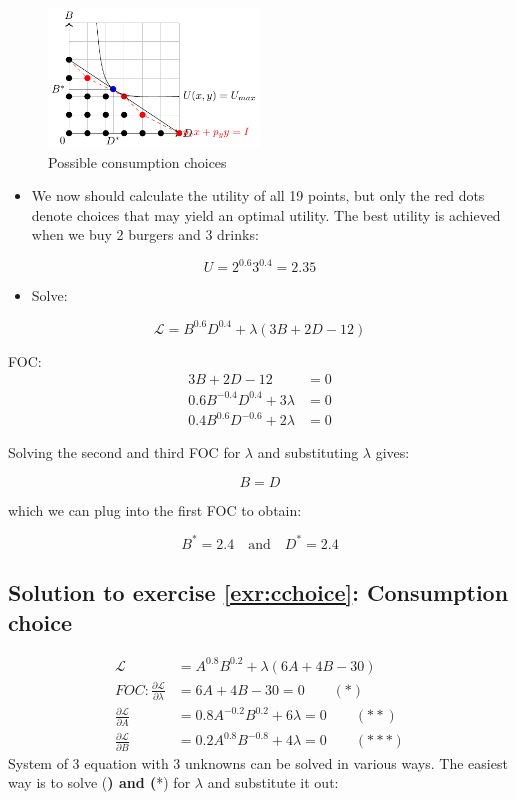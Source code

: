 \documentclass[
  12pt,
  oneside]{book}
\providecommand{\tightlist}{%
  \setlength{\itemsep}{0pt}\setlength{\parskip}{0pt}}
\theoremstyle{definition}
\theoremstyle{definition}
\theoremstyle{definition}
\theoremstyle{definition}
\theoremstyle{remark}
\begin{document}
\begin{figure}
\centering
\includegraphics[width=0.5\textwidth,height=\textheight]{fig/burgerutility.png}
\caption{\label{fig:burgerutility2} Possible consumption choices}
\end{figure}

\begin{itemize}
\tightlist
\item
  We now should calculate the utility of all 19 points, but only the red dots denote choices that may yield an optimal utility. The best utility is achieved when we buy 2 burgers and 3 drinks:
\end{itemize}

\[U=2^{0.6}3^{0.4}=2.35\]

\begin{itemize}
\tightlist
\item
  Solve:
\end{itemize}

\[
\mathcal{L}=B^{0.6}D^{0.4}+\lambda(3B+2D-12)
\]

FOC:
\begin{align*}
3B+2D-12&=0\\
0.6B^{-0.4}D^{0.4}+3\lambda&=0\\
0.4B^{0.6}D^{-0.6}+2\lambda&=0
\end{align*}

Solving the second and third FOC for \(\lambda\) and substituting \(\lambda\) gives:

\[B=D\]

which we can plug into the first FOC to obtain:

\[B^*=2.4 \quad \text{and} \quad D^*=2.4\]

\hypertarget{sol:cchoice}{%
\subsection*{Solution to exercise \ref{exr:cchoice}: Consumption choice}\label{sol:cchoice}}

\begin{align*}
\mathcal{L}&=A^{0.8}B^{0.2}+\lambda(6A+4B-30)\\
FOC: \frac{\partial \mathcal{L}}{\partial \lambda}&=6A+4B-30=0 \qquad (*)\\
\frac{\partial \mathcal{L}}{\partial A}&=0.8A^{-0.2}B^{0.2}+6\lambda=0 \qquad (**)\\
\frac{\partial \mathcal{L}}{\partial B}&=0.2A^{0.8}B^{-0.8}+4\lambda=0 \qquad (***)
\end{align*}
System of 3 equation with 3 unknowns can be solved in various ways.
The easiest way is to solve (\textbf{) and (}*) for \(\lambda\) and substitute it out:
\end{document}

